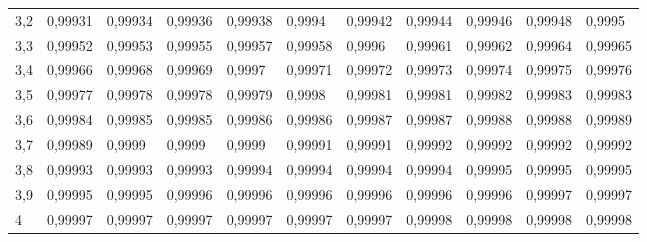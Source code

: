 \documentclass[addpoints,spanish, 12pt,a4paper]{exam}
\begin{document}
\begin{table}
\begin{tabular}{l|llllllllll}
3,2 & 0,99931 & 0,99934 & 0,99936 & 0,99938 & 0,9994  & 0,99942 & 0,99944 & 0,99946 & 0,99948 & 0,9995  \\
3,3 & 0,99952 & 0,99953 & 0,99955 & 0,99957 & 0,99958 & 0,9996  & 0,99961 & 0,99962 & 0,99964 & 0,99965 \\
3,4 & 0,99966 & 0,99968 & 0,99969 & 0,9997  & 0,99971 & 0,99972 & 0,99973 & 0,99974 & 0,99975 & 0,99976 \\
3,5 & 0,99977 & 0,99978 & 0,99978 & 0,99979 & 0,9998  & 0,99981 & 0,99981 & 0,99982 & 0,99983 & 0,99983 \\
3,6 & 0,99984 & 0,99985 & 0,99985 & 0,99986 & 0,99986 & 0,99987 & 0,99987 & 0,99988 & 0,99988 & 0,99989 \\
3,7 & 0,99989 & 0,9999  & 0,9999  & 0,9999  & 0,99991 & 0,99991 & 0,99992 & 0,99992 & 0,99992 & 0,99992 \\
3,8 & 0,99993 & 0,99993 & 0,99993 & 0,99994 & 0,99994 & 0,99994 & 0,99994 & 0,99995 & 0,99995 & 0,99995 \\
3,9 & 0,99995 & 0,99995 & 0,99996 & 0,99996 & 0,99996 & 0,99996 & 0,99996 & 0,99996 & 0,99997 & 0,99997 \\
4   & 0,99997 & 0,99997 & 0,99997 & 0,99997 & 0,99997 & 0,99997 & 0,99998 & 0,99998 & 0,99998 & 0,99998
\end{tabular}
\end{table}
\restoregeometry
    
\end{document}

